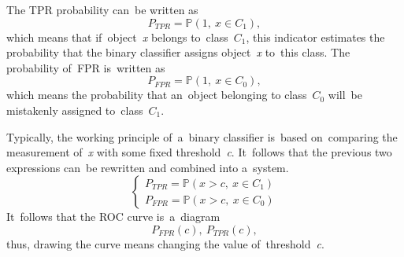 \documentclass[]{scrreprt}
\begin{document}
%
The TPR probability can~be written as
\begin{equation}\label{eq:TPR-probability}
P_{TPR} = \mathbb{P}(1,\ x\in C_{1}),
\end{equation}
which means that if~object~\textit{x} belongs to~class~$C_{1}$, this indicator estimates the probability that the binary classifier assigns object~\textit{x} to~this class. The probability of~FPR is~written as
\begin{equation}\label{eq:FPR-probability}
P_{FPR} = \mathbb{P}(1,\ x\in C_{0}),
\end{equation}
which means the probability that an~object belonging to class~$C_0$ will~be mistakenly assigned to~class~$C_1$.

Typically, the working principle of~a~binary classifier is~based on~comparing the measurement of~\textit{x} with some fixed threshold~\textit{c}. It~follows that the previous two expressions can~be rewritten and combined into a~system.
\begin{equation}\label{eq:TRP+FPR-probability}
\begin{cases}
P_{TPR} = \mathbb{P}(x>c,\ x \in C_{1})\\
P_{FPR} = \mathbb{P}(x>c,\ x \in C_{0})
\end{cases}
\end{equation}
It~follows that the ROC curve is~a~diagram
\begin{equation}\label{eq:ROC-contour}
P_{FPR}(c),\ P_{TPR}(c),
\end{equation}
thus, drawing the curve means changing the value of~threshold~\textit{c}.
\end{document}
